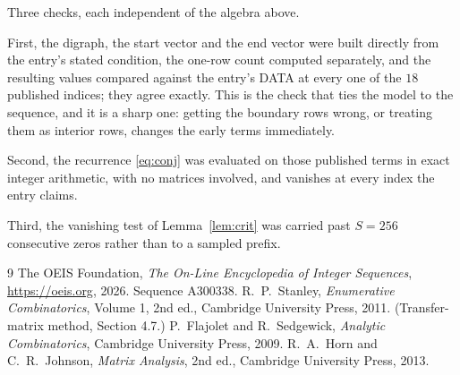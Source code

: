 \documentclass[11pt,a4paper]{article}
\theoremstyle{plain}
\theoremstyle{definition}
\begin{document}
Three checks, each independent of the algebra above.

First, the digraph, the start vector and the end vector were built directly from the
entry's stated condition, the one-row count computed separately, and the resulting values
compared against the entry's DATA at every one of the $18$ published indices; they
agree exactly. This is the check that ties the model to the sequence, and it is a sharp one:
getting the boundary rows wrong, or treating them as interior rows, changes the early terms
immediately.

Second, the recurrence \eqref{eq:conj} was evaluated on those published terms in exact
integer arithmetic, with no matrices involved, and vanishes at every index the entry claims.

Third, the vanishing test of Lemma~\ref{lem:crit} was carried past $S=256$ consecutive
zeros rather than to a sampled prefix.

\begin{thebibliography}{9}
 The OEIS Foundation, \emph{The On-Line Encyclopedia of Integer
Sequences}, \url{https://oeis.org}, 2026. Sequence A300338.
 R.~P.~Stanley, \emph{Enumerative Combinatorics}, Volume 1, 2nd ed.,
Cambridge University Press, 2011. (Transfer-matrix method, Section 4.7.)
 P.~Flajolet and R.~Sedgewick, \emph{Analytic Combinatorics}, Cambridge
University Press, 2009.
 R.~A.~Horn and C.~R.~Johnson, \emph{Matrix Analysis}, 2nd ed., Cambridge
University Press, 2013.
\end{thebibliography}
\end{document}
